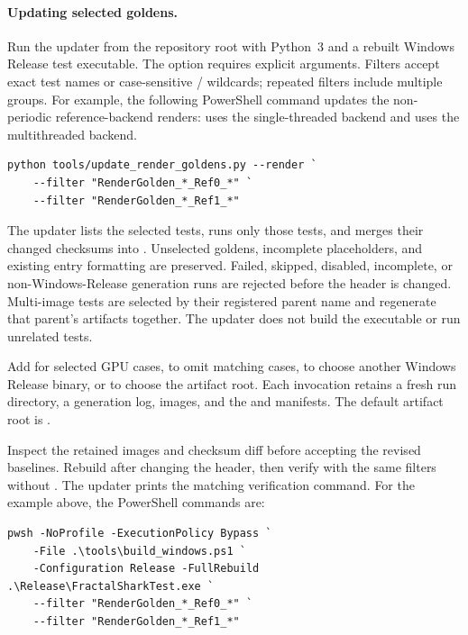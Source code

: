 \paragraph{Updating selected goldens.}
Run the updater from the repository root with Python~3 and a rebuilt Windows
Release test executable. The  option requires explicit
 arguments. Filters accept exact test names or case-sensitive
\code{*}/ wildcards; repeated filters include multiple groups.
For example, the following PowerShell command updates the non-periodic
reference-backend renders:  uses the single-threaded backend and
 uses the multithreaded backend.

\begin{lstlisting}[language={},upquote=true]
python tools/update_render_goldens.py --render `
    --filter "RenderGolden_*_Ref0_*" `
    --filter "RenderGolden_*_Ref1_*"
\end{lstlisting}

The updater lists the selected tests, runs only those tests, and merges their
changed checksums into . Unselected
goldens, incomplete placeholders, and existing entry formatting are preserved.
Failed, skipped, disabled, incomplete, or non-Windows-Release generation runs
are rejected before the header is changed. Multi-image tests are selected by
their registered parent name and regenerate that parent's artifacts together.
The updater does not build the executable or run unrelated tests.

Add  for selected GPU cases,  to
omit matching cases,  to choose another Windows Release
binary, or  to choose the artifact root. Each
invocation retains a fresh run directory, a generation log, images, and the
 and  manifests. The default artifact
root is .

Inspect the retained images and checksum diff before accepting the revised
baselines. Rebuild after changing the header, then verify with the same filters
without . The updater prints the matching
verification command. For the example above, the PowerShell commands are:

\begin{lstlisting}[language={},upquote=true]
pwsh -NoProfile -ExecutionPolicy Bypass `
    -File .\tools\build_windows.ps1 `
    -Configuration Release -FullRebuild
.\Release\FractalSharkTest.exe `
    --filter "RenderGolden_*_Ref0_*" `
    --filter "RenderGolden_*_Ref1_*"
\end{lstlisting}


